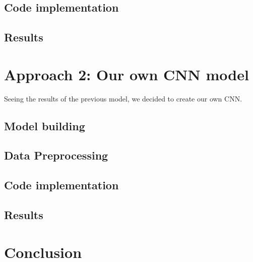 \documentclass{article}
\begin{document}
    	\newpage
    	\subsection{Code implementation}
    	
    
    	\newpage
    	\subsection{Results}
    	
    	
    \newpage
    \section{Approach 2: Our own CNN model}
    Seeing the results of the previous model, we decided to create our own CNN.

    	    	
    	\subsection{Model building}
    	
    
    	\newpage
    	\subsection{Data Preprocessing}
    	
    	
    	\newpage
    	\subsection{Code implementation}
    	
    
    	\newpage
    	\subsection{Results}
    	

	\newpage
    \section{Conclusion}
    
    
    
    
\end{document}
